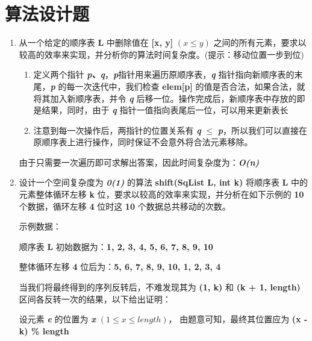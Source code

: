 \section{算法设计题}
\begin{enumerate}
    \item 从一个给定的顺序表 \textbf{L} 中删除值在 \textbf{[x, y]} $(x \leq y)$ 之间的所有元素，要求以较高的效率来实现，并分析你的算法时间复杂度。(提示：移动位置一步到位)
        \begin{mquote}
            \begin{enumerate}
                \item 定义两个指针 \textbf{\textit{p、q}}，\textbf{\textit{p}}指针用来遍历原顺序表，\textbf{\textit{q}} 指针指向新顺序表的末尾，\textbf{\textit{p}} 的每一次迭代中，我们检查 \textbf{elem[p]} 的值是否合法，如果合法，就将其加入新顺序表，并令 \textbf{\textit{q}} 后移一位。操作完成后，新顺序表中存放的即是结果，同时，由于 \textbf{\textit{q}} 指针一值指向表尾后一位，可以用来更新表长
                \item 注意到每一次操作后，两指针的位置关系有 \textbf{\textit{q}} $\leq$ \textbf{\textit{p}}，所以我们可以直接在原顺序表上进行操作，同时保证不会意外将合法元素移除。
            \end{enumerate}
            \par 由于只需要一次遍历即可求解出答案，因此时间复杂度为：\textbf{\textit{O(n)}}    
        \end{mquote}
        
    \item 设计一个空间复杂度为 \textbf{\textit{0(1)}} 的算法 \textbf{shift(SqList L, int k)} 将顺序表 \textbf{L} 中的元素整体循环左移 \textbf{k} 位，要求以较高的效率来实现，并分析在如下示例的 \textbf{10} 个数据，循环左移 \textbf{4} 位时这 \textbf{10} 个数据总共移动的次数。
        \par 示例数据：
        \par 顺序表 \textbf{L} 初始数据为：\textbf{1, 2, 3, 4, 5, 6, 7, 8, 9, 10}
        \par 整体循环左移 \textbf{4} 位后为：\textbf{5, 6, 7, 8, 9, 10, 1, 2, 3, 4}
        \begin{mquote}
            \par 当我们将最终得到的序列反转后，不难发现其为 \textbf{(1, k)} 和 \textbf{(k + 1, length)} 区间各反转一次的结果，以下给出证明：
            \par 设元素 \textbf{\textit{e}} 的位置为 \textbf{\textit{x}} $(1 \leq x \leq length)$， 由题意可知，最终其位置应为 \textbf{(x - k) \% length}

\end{mquote}
\end{enumerate}
